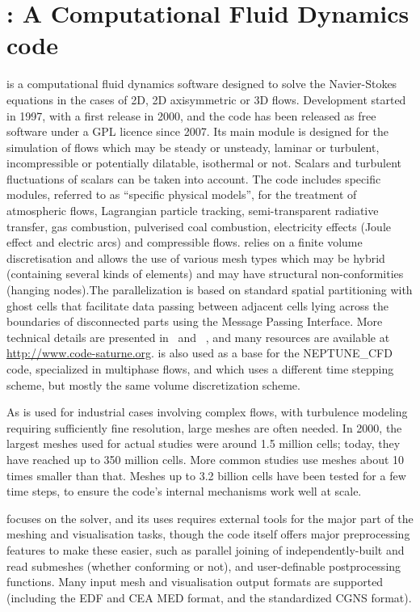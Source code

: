 \section{\CS: A Computational Fluid Dynamics code}
\label{sec:cs}
\CS is a computational fluid dynamics software designed to solve the
Navier-Stokes equations in the cases of 2D, 2D axisymmetric or 3D
flows. Development started in 1997, with a first release in 2000, and the
code has been released as free software under a GPL licence since 2007.
Its main module is designed for the simulation of flows which may be
steady or unsteady, laminar or turbulent, incompressible or potentially
dilatable, isothermal or not. Scalars and turbulent fluctuations of scalars can
be taken into account. The code includes specific modules, referred to as
``specific physical models'', for the treatment of atmospheric flows, Lagrangian particle
tracking, semi-transparent radiative transfer, gas combustion, pulverised coal
combustion, electricity effects (Joule effect and electric arcs) and
compressible flows. \CS relies on a finite volume discretisation and
allows the use of various mesh types which may be hybrid (containing several
kinds of elements) and may have structural non-conformities (hanging nodes).The
parallelization is based on standard spatial partitioning with ghost cells
that facilitate data passing between adjacent cells lying across the boundaries
of disconnected parts using the Message Passing Interface. More
technical details are presented in~\cite{cs2004} and ~\cite{userguide},
and many resources are available at \url{http://www.code-saturne.org}.
\CS is also used as a base for the NEPTUNE\_CFD code, specialized in
multiphase flows, and which uses a different time stepping scheme,
but mostly the same volume discretization scheme.

As \CS is used for industrial cases involving complex flows, with turbulence
modeling requiring sufficiently fine resolution, large meshes are often
needed. In 2000, the largest meshes used for actual studies were around
1.5 million cells; today, they have reached up to 350 million cells.
More common studies use meshes about 10 times smaller than that.
Meshes up to 3.2 billion cells have been tested for a few time steps, to
ensure the code's internal mechanisms work well at scale.

\CS focuses on the solver, and its uses requires external tools for the
major part of the meshing and visualisation tasks, though the code itself offers
major preprocessing features to make these easier, such as parallel joining
of independently-built and read submeshes (whether conforming or not),
and user-definable postprocessing functions. Many input mesh and visualisation
output formats are supported (including the EDF and CEA MED format,
and the standardized CGNS format).

